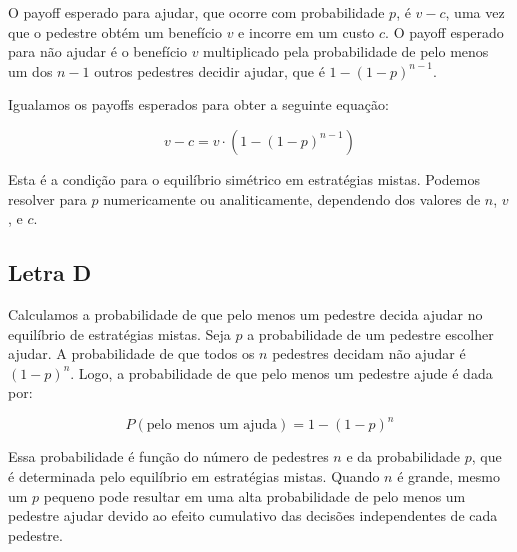 \documentclass[12pt]{article}
\begin{document}
O payoff esperado para ajudar, que ocorre com probabilidade \( p \), é \( v - c \), uma vez que o pedestre obtém um benefício \( v \) e incorre em um custo \( c \). O payoff esperado para não ajudar é o benefício \( v \) multiplicado pela probabilidade de pelo menos um dos \( n - 1 \) outros pedestres decidir ajudar, que é \( 1 - (1 - p)^{n-1} \).

Igualamos os payoffs esperados para obter a seguinte equação:

\[
v - c = v \cdot \left(1 - (1 - p)^{n-1}\right)
\]

Esta é a condição para o equilíbrio simétrico em estratégias mistas. Podemos resolver para \( p \) numericamente ou analiticamente, dependendo dos valores de \( n \), \( v \), e \( c \).

\subsection{\textbf{Letra D}}
Calculamos a probabilidade de que pelo menos um pedestre decida ajudar no equilíbrio de estratégias mistas. Seja \( p \) a probabilidade de um pedestre escolher ajudar. A probabilidade de que todos os \( n \) pedestres decidam não ajudar é \( (1 - p)^n \). Logo, a probabilidade de que pelo menos um pedestre ajude é dada por:

\[ P(\text{pelo menos um ajuda}) = 1 - (1 - p)^n \]

Essa probabilidade é função do número de pedestres \( n \) e da probabilidade \( p \), que é determinada pelo equilíbrio em estratégias mistas. Quando \( n \) é grande, mesmo um \( p \) pequeno pode resultar em uma alta probabilidade de pelo menos um pedestre ajudar devido ao efeito cumulativo das decisões independentes de cada pedestre.
\end{document}
